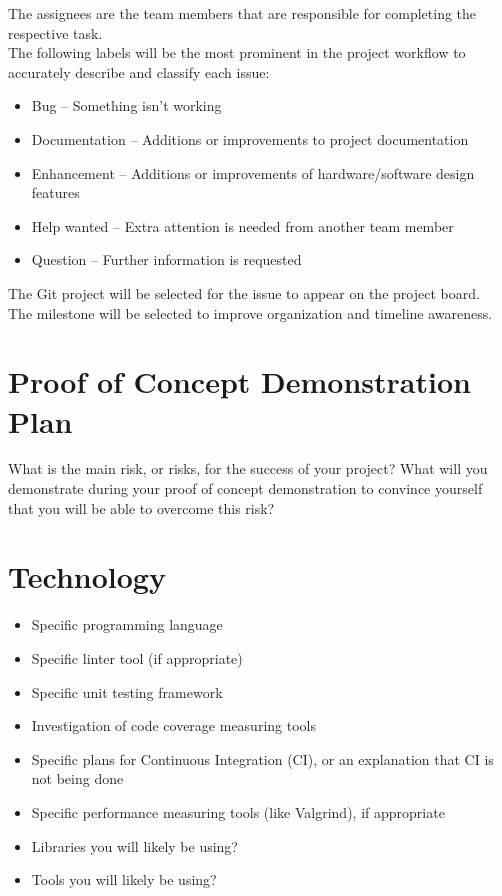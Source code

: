 \documentclass{article}
\begin{document}
	\noindent The assignees are the team members that are responsible for completing the respective task.\\

	\noindent The following labels will be the most prominent in the project workflow to accurately describe and classify each issue: 

	\begin{itemize}
		\item Bug – Something isn’t working
		\item Documentation – Additions or improvements to project documentation 
		\item Enhancement – Additions or improvements of hardware/software design features 
		\item Help wanted – Extra attention is needed from another team member 
		\item Question – Further information is requested 
	\end{itemize}
	\noindent The Git project will be selected for the issue to appear on the project board.\\

	\noindent The milestone will be selected to improve organization and timeline awareness.\\
	
	\section{Proof of Concept Demonstration Plan}
	
	What is the main risk, or risks, for the success of your project?  What will you
	demonstrate during your proof of concept demonstration to convince yourself that
	you will be able to overcome this risk?
	
	\section{Technology}
	
	\begin{itemize}
	\item Specific programming language
	\item Specific linter tool (if appropriate)
	\item Specific unit testing framework
	\item Investigation of code coverage measuring tools
	\item Specific plans for Continuous Integration (CI), or an explanation that CI
	  is not being done
	\item Specific performance measuring tools (like Valgrind), if
	  appropriate
	\item Libraries you will likely be using?
	\item Tools you will likely be using?
	\end{itemize}
	
\end{document}

